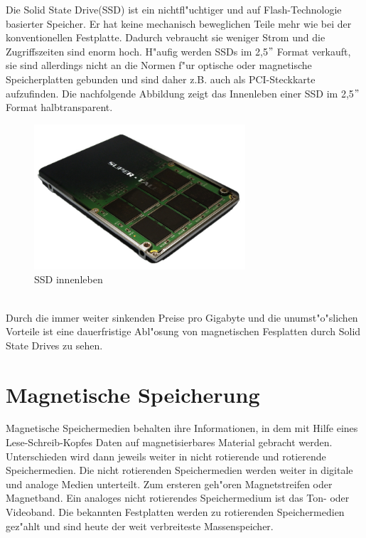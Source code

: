 				Die Solid State Drive(SSD) ist ein nichtfl"uchtiger und auf Flash-Technologie basierter Speicher. Er hat keine mechanisch beweglichen Teile mehr wie bei der konventionellen Festplatte. Dadurch vebraucht sie weniger Strom und die Zugriffszeiten sind enorm hoch. H"aufig werden SSDs im 2,5$"$ Format verkauft, sie sind allerdings nicht an die Normen f"ur optische oder magnetische Speicherplatten gebunden und sind daher z.B. auch als PCI-Steckkarte aufzufinden. Die nachfolgende Abbildung zeigt das Innenleben einer SSD im 2,5$"$ Format halbtransparent.
				\begin{figure}[ht]
				\centering
				\includegraphics[width=0.7\textwidth]{images/ssd} 
				\caption[SSD innenleben \cite{fig:ssd}]{SSD innenleben}
				\label{fig:ssd}
				\end{figure}
				\\
				Durch die immer weiter sinkenden Preise pro Gigabyte und die unumst"o"slichen Vorteile ist eine dauerfristige Abl"osung von magnetischen Fesplatten durch Solid State Drives zu sehen.
				
				
			
			
			
    \section{Magnetische Speicherung}
    \label{ch:Technisch:sec:Magnetische Speicherung}
    
    Magnetische Speichermedien behalten ihre Informationen, in dem mit Hilfe eines Lese-Schreib-Kopfes Daten auf magnetisierbares Material gebracht werden. Unterschieden wird dann jeweils weiter in nicht rotierende und rotierende Speichermedien. Die nicht rotierenden Speichermedien werden weiter in digitale und analoge Medien unterteilt. Zum ersteren geh"oren Magnetstreifen oder Magnetband. Ein analoges nicht rotierendes Speichermedium ist das Ton- oder Videoband. Die bekannten Festplatten werden zu rotierenden Speichermedien gez"ahlt und sind heute der weit verbreiteste Massenspeicher.

